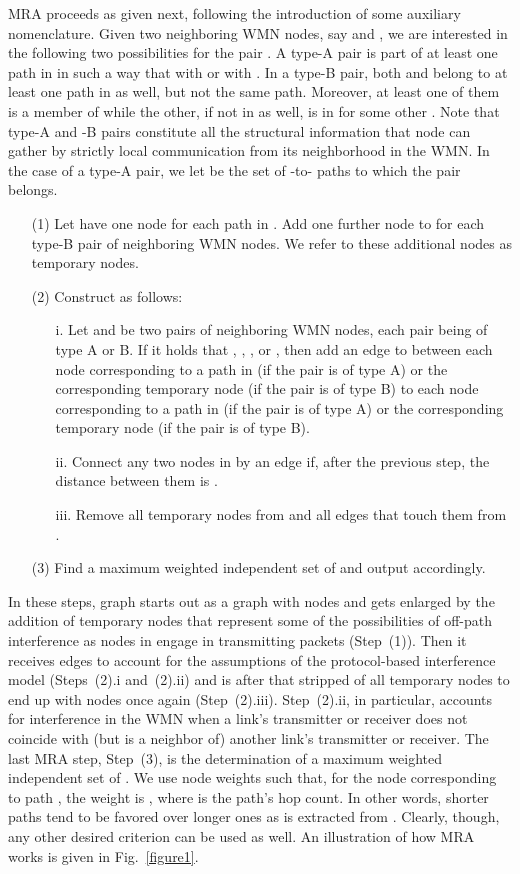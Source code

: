 \documentclass{article}
\begin{document}
MRA proceeds as given next, following the introduction of some auxiliary
nomenclature. Given two neighboring WMN nodes, say  and , we are
interested in the following two possibilities for the pair . A type-A pair
is part of at least one path in  in such a way that
 with  or 
with . In a type-B pair, both  and  belong to at least one
path in  as well, but not the same path. Moreover, at least
one of them is a member of  while the other, if not in  as well, is in
 for some other . Note that type-A and -B pairs
constitute all the structural information that node  can gather by strictly
local communication from its neighborhood  in the WMN. In the case of a
type-A pair, we let  be the set of -to- paths to
which the pair belongs.

\begin{enumerate}
\item[(1)] Let  have one node for each path in . Add one
further node to  for each type-B pair of neighboring WMN nodes. We refer to
these additional nodes as temporary nodes.
\item[(2)] Construct  as follows:
\begin{enumerate}
\item[i.] Let  and  be two pairs of neighboring WMN nodes, each
pair being of type A or B. If it holds that , , , or ,
then add an edge to  between each node corresponding to a path in
 (if the pair is of type A) or the corresponding temporary
node (if the pair is of type B) to each node corresponding to a path in
 (if the pair is of type A) or the corresponding temporary
node (if the pair is of type B).
\item[ii.] Connect any two nodes in  by an edge if, after the previous step,
the distance between them is .
\item[iii.] Remove all temporary nodes from  and all edges that touch them
from .
\end{enumerate}
\item[(3)] Find a maximum weighted independent set of  and output
 accordingly.
\end{enumerate}

In these steps, graph  starts out as a graph with
 nodes and gets enlarged by the addition of
temporary nodes that represent some of the possibilities of off-path
interference as nodes in  engage in transmitting packets (Step~(1)). Then
it receives edges to account for the assumptions of the protocol-based
interference model (Steps~(2).i and~(2).ii) and is after that stripped of all
temporary nodes to end up with  nodes once again
(Step~(2).iii). Step~(2).ii, in particular, accounts for interference in the
WMN when a link's transmitter or receiver does not coincide with (but is a
neighbor of) another link's transmitter or receiver. The last MRA step,
Step~(3), is the determination of a maximum weighted independent set of
. We use node weights such that, for the node corresponding to path
, the weight is , where  is the path's hop
count. In other words, shorter paths tend to be favored over longer ones as
 is extracted from . Clearly,
though, any other desired criterion can be used as well. An illustration of how
MRA works is given in Fig.~\ref{figure1}.
\end{document}
